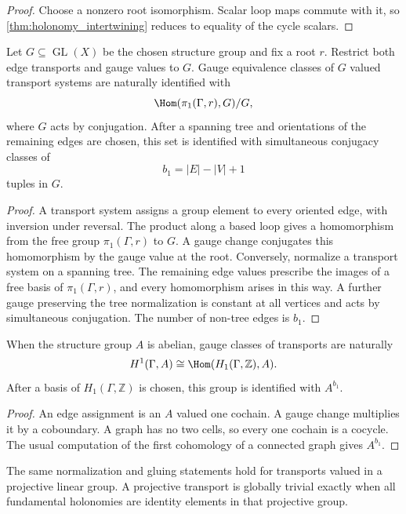 \begin{proof}
Choose a nonzero root isomorphism.  Scalar loop maps commute with it, so \cref{thm:holonomy_intertwining} reduces to equality of the cycle scalars.
\end{proof}

\begin{theorem}\label{thm:gauge_classification}
Let $G\subseteq\operatorname{GL}(X)$ be the chosen structure group and fix a root $r$.  Restrict both edge transports and gauge values to $G$.  Gauge equivalence classes of $G$ valued transport systems are naturally identified with
\[
\Hom(\pi_1(\Gamma,r),G)/G,
\]
where $G$ acts by conjugation.  After a spanning tree and orientations of the remaining edges are chosen, this set is identified with simultaneous conjugacy classes of
\[
b_1=|E|-|V|+1
\]
tuples in $G$.
\end{theorem}

\begin{proof}
A transport system assigns a group element to every oriented edge, with inversion under reversal.  The product along a based loop gives a homomorphism from the free group $\pi_1(\Gamma,r)$ to $G$.  A gauge change conjugates this homomorphism by the gauge value at the root.  Conversely, normalize a transport system on a spanning tree.  The remaining edge values prescribe the images of a free basis of $\pi_1(\Gamma,r)$, and every homomorphism arises in this way.  A further gauge preserving the tree normalization is constant at all vertices and acts by simultaneous conjugation.  The number of non-tree edges is $b_1$.
\end{proof}

\begin{corollary}\label{cor:abelian_holonomy_class}
When the structure group $A$ is abelian, gauge classes of transports are naturally
\[
H^1(\Gamma,A)
\cong
\Hom(H_1(\Gamma,\mathbb Z),A).
\]
After a basis of $H_1(\Gamma,\mathbb Z)$ is chosen, this group is identified with $A^{b_1}$.
\end{corollary}

\begin{proof}
An edge assignment is an $A$ valued one cochain.  A gauge change multiplies it by a coboundary.  A graph has no two cells, so every one cochain is a cocycle.  The usual computation of the first cohomology of a connected graph gives $A^{b_1}$.
\end{proof}

\begin{corollary}\label{cor:projective_transport}
The same normalization and gluing statements hold for transports valued in a projective linear group.  A projective transport is globally trivial exactly when all fundamental holonomies are identity elements in that projective group.
\end{corollary}

